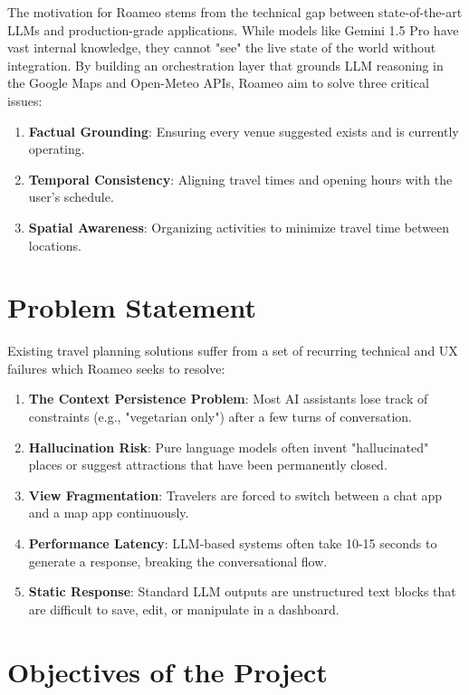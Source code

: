 \documentclass[12pt,a4paper]{report}
\begin{document}
The motivation for Roameo stems from the technical gap between state-of-the-art LLMs and production-grade applications. While models like Gemini 1.5 Pro have vast internal knowledge, they cannot "see" the live state of the world without integration. By building an orchestration layer that grounds LLM reasoning in the Google Maps and Open-Meteo APIs, Roameo aim to solve three critical issues:
\begin{enumerate}[nosep]
    \item \textbf{Factual Grounding}: Ensuring every venue suggested exists and is currently operating.
    \item \textbf{Temporal Consistency}: Aligning travel times and opening hours with the user's schedule.
    \item \textbf{Spatial Awareness}: Organizing activities to minimize travel time between locations.
\end{enumerate}

\section{Problem Statement}

Existing travel planning solutions suffer from a set of recurring technical and UX failures which Roameo seeks to resolve:

\begin{enumerate}[leftmargin=*, label=\textbf{P\arabic*.}]
  \item \textbf{The Context Persistence Problem}: Most AI assistants lose track of constraints (e.g., "vegetarian only") after a few turns of conversation.
  \item \textbf{Hallucination Risk}: Pure language models often invent "hallucinated" places or suggest attractions that have been permanently closed.
  \item \textbf{View Fragmentation}: Travelers are forced to switch between a chat app and a map app continuously.
  \item \textbf{Performance Latency}: LLM-based systems often take 10-15 seconds to generate a response, breaking the conversational flow.
  \item \textbf{Static Response}: Standard LLM outputs are unstructured text blocks that are difficult to save, edit, or manipulate in a dashboard.
\end{enumerate}

\section{Objectives of the Project}
\end{document}
